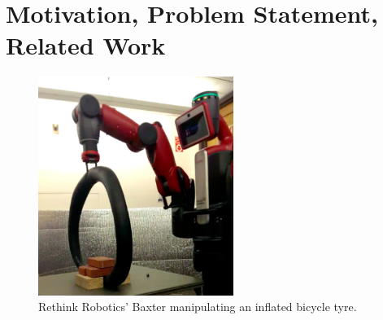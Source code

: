 \documentclass[runningheads,a4paper]{llncs}
\begin{document}
\section{Motivation, Problem Statement, Related Work} 
\begin{figure}
\centering
\includegraphics[width = 180pt]{baxter_experiment_image}
\caption{Rethink Robotics' Baxter manipulating an inflated bicycle tyre.}
\label{fig-baxter_image_1}
\end{figure}
\end{document}
